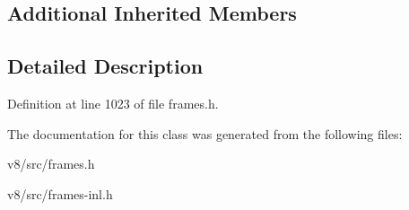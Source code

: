 \subsection*{Additional Inherited Members}


\subsection{Detailed Description}


Definition at line 1023 of file frames.\+h.



The documentation for this class was generated from the following files\+:\begin{DoxyCompactItemize}
\item 
v8/src/frames.\+h\item 
v8/src/frames-\/inl.\+h\end{DoxyCompactItemize}
